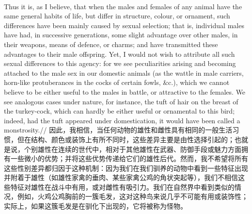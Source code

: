 \documentclass{article}
\begin{document}
\\
Thus it is, as I believe, that when the males and females of any animal have the same general habits of life, but differ in structure, colour, or ornament, such differences have been mainly caused by sexual selection; that is, individual males have had, in successive generations, some slight advantage over other males, in their weapons, means of defence, or charms; and have transmitted these advantages to their male offspring. Yet, I would not wish to attribute all such sexual differences to this agency: for we see peculiarities arising and becoming attached to the male sex in our domestic animals (as the wattle in male carriers, horn-like protuberances in the cocks of certain fowls, \&c.), which we cannot believe to be either useful to the males in battle, or attractive to the females. We see analogous cases under nature, for instance, the tuft of hair on the breast of the turkey-cock, which can hardly be either useful or ornamental to this bird; indeed, had the tuft appeared under domestication, it would have been called a monstrosity.//
因此，我相信，当任何动物的雄性和雌性具有相同的一般生活习惯，但在结构、颜色或装饰上有所不同时，这些差异主要是由性选择引起的；也就是说，个别雄性在连续的世代中，相对于其他雄性在武器、防御手段或魅力方面拥有一些微小的优势；并将这些优势传递给它们的雄性后代。然而，我不希望将所有这些性别差异都归因于这种机制：因为我们在我们驯养的动物中看到一些特征出现并附着于雄性（如雄性家禽的垂肉、某些家禽公鸡的角状突起等），我们不相信这些特征对雄性在战斗中有用，或对雌性有吸引力。我们在自然界中看到类似的情况，例如，火鸡公鸡胸前的一簇毛发，这对这种鸟来说几乎不可能有用或装饰性；实际上，如果这簇毛发是在驯化下出现的，它将被称为怪物。
\end{document}
